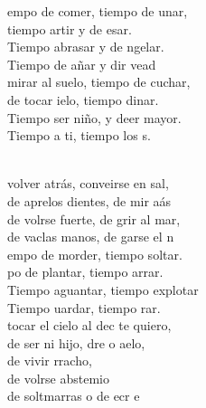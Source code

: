 \documentclass[12pt]{article}
\begin{document}
\begin{multicols*}{2}
\begin{cancion}
	\begin{chorus}%
	empo de comer, tiempo de unar,\\
	tiempo artir y de esar.\\
	Tiempo  abrasar y de ngelar.\\
	Tiempo de añar y dir vead\\
\jump
	 mirar al suelo, tiempo de cuchar,\\
	de tocar ielo, tiempo dinar.\\
	Tiempo  ser niño, y deer mayor.\\
	Tiempo a ti, tiempo  los s.\\
	\end{chorus}%
	\jump\\
	 volver atrás, conveirse en sal,\\
	de aprelos dientes, de mir aás\\
	de volrse fuerte, de grir al mar,\\
	de vaclas manos, de garse el n\\
\jump
	empo de morder, tiempo  soltar.\\
	po de plantar, tiempo  arrar.\\
	Tiempo  aguantar, tiempo  explotar\\
	Tiempo uardar, tiempo  rar.\\
\jump
	 tocar el cielo al dec te quiero,\\
	de ser ni hijo, dre o aelo,\\
	de vivir rracho, \\
	de volrse abstemio\\
	de soltmarras o de ecr  e\\\jump\\

\end{cancion}
\end{multicols*}
\end{document}
